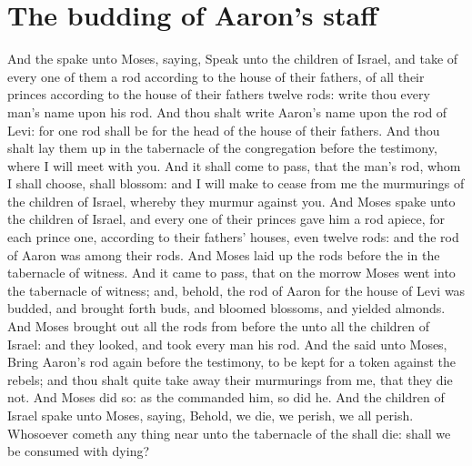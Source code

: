 \section*{The budding of Aaron's staff}
\begin{biblechapter} %
\verse And the \LORD spake unto Moses, saying,
\verse Speak unto the children of Israel, and take of every one of them a rod according to the house of their fathers, of all their princes according to the house of their fathers twelve rods: write thou every man's name upon his rod.
\verse And thou shalt write Aaron's name upon the rod of Levi: for one rod shall be for the head of the house of their fathers.
\verse And thou shalt lay them up in the tabernacle of the congregation before the testimony, where I will meet with you.
\verse And it shall come to pass, that the man's rod, whom I shall choose, shall blossom: and I will make to cease from me the murmurings of the children of Israel, whereby they murmur against you.
\verse And Moses spake unto the children of Israel, and every one of their princes gave him a rod apiece, for each prince one, according to their fathers' houses, even twelve rods: and the rod of Aaron was among their rods.
\verse And Moses laid up the rods before the \LORD in the tabernacle of witness.
\verse And it came to pass, that on the morrow Moses went into the tabernacle of witness; and, behold, the rod of Aaron for the house of Levi was budded, and brought forth buds, and bloomed blossoms, and yielded almonds.
\verse And Moses brought out all the rods from before the \LORD unto all the children of Israel: and they looked, and took every man his rod.
\verse And the \LORD said unto Moses, Bring Aaron's rod again before the testimony, to be kept for a token against the rebels; and thou shalt quite take away their murmurings from me, that they die not.
\verse And Moses did so: as the \LORD commanded him, so did he.
\verse And the children of Israel spake unto Moses, saying, Behold, we die, we perish, we all perish.
\verse Whosoever cometh any thing near unto the tabernacle of the \LORD shall die: shall we be consumed with dying?
\end{biblechapter}

